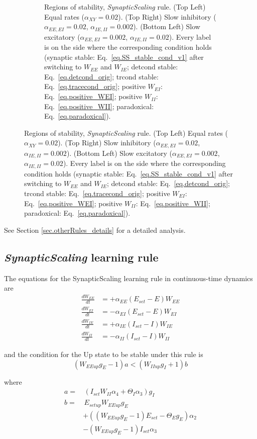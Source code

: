 \documentclass[twocolumn]{article}
\newcommand{\EE}{\mathit{EE}}
\newcommand{\EI}{\mathit{EI}}
\newcommand{\IE}{\mathit{IE}}
\newcommand{\II}{\mathit{II}}
\newcommand{\XY}{\mathit{XY}}
\newcommand{\set}{\mathit{set}}
\newcommand{\up}{\mathit{up}}
\begin{document}
\begin{figure}[!ht]
{\begin{figure}[H]
\caption{Regions of stability, {\em SynapticScaling} rule. (Top Left) Equal rates ($\alpha_{\XY}=0.02$). (Top Right) Slow inhibitory ($\alpha_{\EE,\EI}=0.02$, $\alpha_{\IE,\II}=0.002$). (Bottom Left) Slow excitatory ($\alpha_{\EE,\EI}=0.002$, $\alpha_{\IE,\II}=0.02$). Every label is on the side where the  corresponding  condition  holds (synaptic stable: Eq.\ \ref{eq.SS_stable_cond_v1} after switching to $W_{\EE}$ and $W_{\IE}$; detcond stable: Eq.\ \ref{eq.detcond_orig}; trcond stable: Eq.\ \ref{eq.tracecond_orig}; positive $W_{\EI}$: Eq.\ \ref{eq.positive_WEI}; positive $W_{\II}$: Eq.\ \ref{eq.positive_WII}; paradoxical: Eq.\ \ref{eq.paradoxical}).}
\label{fig.SS_stability}
\end{figure}}
\end{figure}




See Section \ref{sec.otherRules_details} for a detailed analysis.



\subsection{{\em SynapticScaling} learning rule}


The equations for the SynapticScaling learning rule in continuous-time dynamics are
\begin{equation}
\begin{aligned}
\frac{dW_{\EE}}{dt} & = +\alpha_{\EE} (E_{\set} - E) W_{\EE} \\
\frac{dW_{\EI}}{dt} & = -\alpha_{\EI} (E_{\set} - E) W_{\EI} \\
\frac{dW_{\IE}}{dt} & = +\alpha_{\IE} (I_{\set} - I) W_{\IE} \\
\frac{dW_{\II}}{dt} & = -\alpha_{\II} (I_{\set} - I) W_{\II}
\end{aligned}
\label{eq.SS_summary}
\end{equation}

\noindent and the condition for the Up state to be stable under this rule is
\begin{equation}
(W_{\EE\up}g_E - 1)a < (W_{\II\up}g_I + 1)b
\label{eq.SS_stable_cond_v1}
\end{equation}

\noindent where
\begin{displaymath}
\begin{aligned}
a = & \, (I_{\set} W_{\II} \alpha_4 + \Theta_I \alpha_3)g_I \\
b = & \, E_{\set\up} W_{\EE\up}g_E \\
& + ((W_{\EE\up} g_E - 1) E_{\set} - \Theta_E g_E)\alpha_2 \\
& - (W_{\EE\up} g_E - 1) I_{\set} \alpha_3
\end{aligned}
\end{displaymath}
\end{document}
